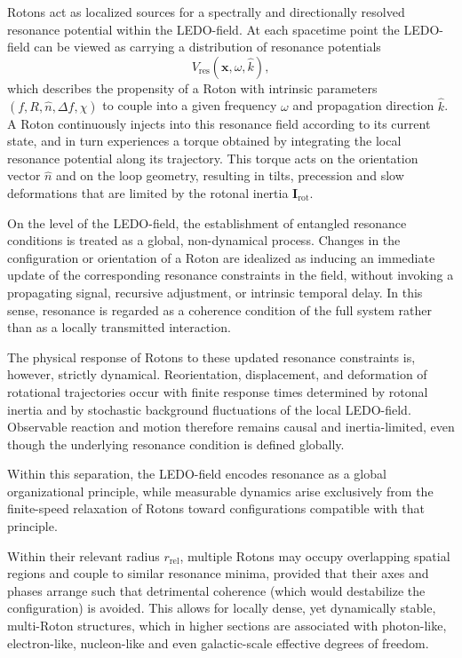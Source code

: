 \documentclass[11pt,a4paper]{article}
\begin{document}
Rotons act as localized sources for a spectrally and directionally resolved resonance potential within the LEDO-field. At each spacetime point the LEDO-field can be viewed as carrying a distribution of resonance potentials
\[
V_{\mathrm{res}}(\mathbf{x},\omega,\hat{k}),
\]
which describes the propensity of a Roton with intrinsic parameters $(f,R,\hat{n},\Delta f,\chi)$ to couple into a given frequency $\omega$ and propagation direction $\hat{k}$. A Roton continuously injects into this resonance field according to its current state, and in turn experiences a torque obtained by integrating the local resonance potential along its trajectory. This torque acts on the orientation vector $\hat{n}$ and on the loop geometry, resulting in tilts, precession and slow deformations that are limited by the rotonal inertia $\mathbf{I}_\mathrm{rot}$.

On the level of the LEDO-field, the establishment of entangled resonance conditions is treated as a global, non-dynamical process. Changes in the configuration or orientation of a Roton are idealized as inducing an immediate update of the corresponding resonance constraints in the field, without invoking a propagating signal, recursive adjustment, or intrinsic temporal delay. In this sense, resonance is regarded as a coherence condition of the full system rather than as a locally transmitted interaction.

The physical response of Rotons to these updated resonance constraints is, however, strictly dynamical. Reorientation, displacement, and deformation of rotational trajectories occur with finite response times determined by rotonal inertia and by stochastic background fluctuations of the local LEDO-field. Observable reaction and motion therefore remains causal and inertia-limited, even though the underlying resonance condition is defined globally.

Within this separation, the LEDO-field encodes resonance as a global organizational principle, while measurable dynamics arise exclusively from the finite-speed relaxation of Rotons toward configurations compatible with that principle.

Within their relevant radius $r_{\mathrm{rel}}$, multiple Rotons may occupy overlapping spatial regions and couple to similar resonance minima, provided that their axes and phases arrange such that detrimental coherence (which would destabilize the configuration) is avoided. This allows for locally dense, yet dynamically stable, multi-Roton structures, which in higher sections are associated with photon-like, electron-like, nucleon-like and even galactic-scale effective degrees of freedom.
\end{document}

